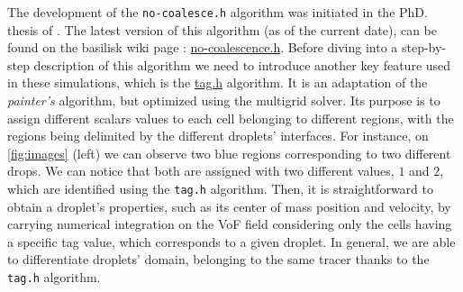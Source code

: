 The development of the \texttt{no-coalesce.h} algorithm was initiated in the PhD. thesis of \citet{mani2021numerical}.
The latest version of this algorithm (as of the current date), can be found on the basilisk wiki page : \href{http://basilisk.fr/sandbox/fintzin/Rising-Suspenion/no-coalescence.h}{no-coalescence.h}.
Before  diving into a step-by-step description of this algorithm we need to introduce another key feature used in these simulations, which is the \href{http://basilisk.fr/src/tag.h}{tag.h} algorithm. 
It is an adaptation of the \textit{painter’s} algorithm, but optimized using the multigrid solver. 
Its purpose is to assign different scalars values to each cell belonging to different regions, with the regions being delimited by the different droplets' interfaces. 
For instance, on \ref{fig:images} (left) we can observe two blue regions corresponding to two different drops.
We can notice that both are assigned with two different values, $1$ and $2$, which are identified using the \texttt{tag.h} algorithm. 
Then, it is straightforward to obtain a droplet's properties, such as its center of mass position and velocity, by carrying numerical integration on the VoF field considering only the cells having a specific tag value, which corresponds to a given droplet.  
In general, we are able to differentiate droplets' domain, belonging to the same tracer thanks to the \texttt{tag.h} algorithm. 

